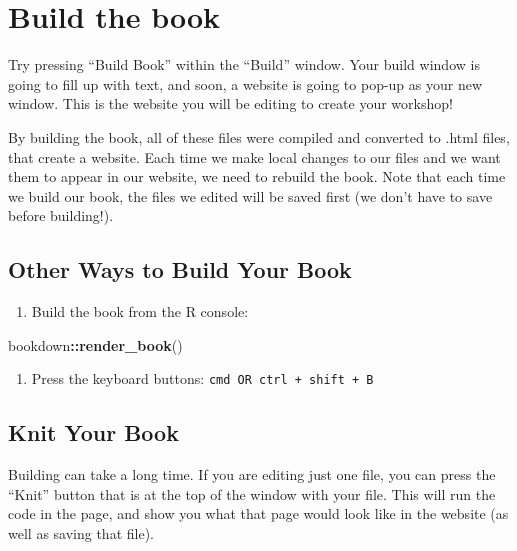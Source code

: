 \documentclass[
]{book}
\newenvironment{Shaded}{\begin{snugshade}}{\end{snugshade}}
\newcommand{\FunctionTok}[1]{\textcolor[rgb]{0.13,0.29,0.53}{\textbf{#1}}}
\newcommand{\NormalTok}[1]{#1}
\newcommand{\SpecialCharTok}[1]{\textcolor[rgb]{0.81,0.36,0.00}{\textbf{#1}}}
\providecommand{\tightlist}{%
  \setlength{\itemsep}{0pt}\setlength{\parskip}{0pt}}
\theoremstyle{definition}
\theoremstyle{definition}
\theoremstyle{definition}
\theoremstyle{definition}
\theoremstyle{remark}
\begin{document}
\section{Build the book}\label{build-the-book}

Try pressing ``Build Book'' within the ``Build'' window. Your build window is going to fill up with text, and soon, a website is going to pop-up as your new window. This is the website you will be editing to create your workshop!

By building the book, all of these files were compiled and converted to .html files, that create a website. Each time we make local changes to our files and we want them to appear in our website, we need to rebuild the book. Note that each time we build our book, the files we edited will be saved first (we don't have to save before building!).

\subsection{Other Ways to Build Your Book}\label{other-ways-to-build-your-book}

\begin{enumerate}
\def\labelenumi{\arabic{enumi}.}
\tightlist
\item
  Build the book from the R console:
\end{enumerate}

\begin{Shaded}
\begin{Highlighting}[]
\NormalTok{bookdown}\SpecialCharTok{::}\FunctionTok{render\_book}\NormalTok{()}
\end{Highlighting}
\end{Shaded}

\begin{enumerate}
\def\labelenumi{\arabic{enumi}.}
\setcounter{enumi}{1}
\tightlist
\item
  Press the keyboard buttons: \texttt{cmd\ OR\ ctrl\ +\ shift\ +\ B}
\end{enumerate}

\subsection{Knit Your Book}\label{knit-your-book}

Building can take a long time. If you are editing just one file, you can press the ``Knit'' button that is at the top of the window with your file. This will run the code in the page, and show you what that page would look like in the website (as well as saving that file).
\end{document}
